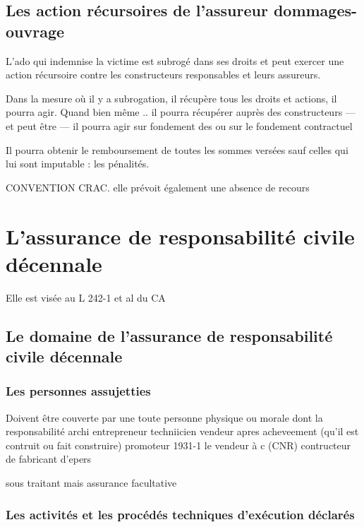 
	\subsection{Les action récursoires de l'assureur dommages-ouvrage}

		L'ado qui indemnise la victime est subrogé dans ses droits et peut exercer une action récursoire contre les constructeurs responsables et leurs assureurs.

		Dans la mesure où il y a subrogation, il récupère tous les droits et actions, il pourra agir. Quand bien même .. il pourra récupérer auprès des constructeurs --- et peut être --- il pourra agir sur fondement des \garSpec ou sur le fondement contractuel 

		Il pourra obtenir le remboursement de toutes les sommes versées sauf celles qui lui sont imputable : les pénalités.

		CONVENTION CRAC. elle prévoit également une absence de recours

\section{L'assurance de responsabilité civile décennale}

	Elle est visée au L 242-1 et al du CA

	\subsection{Le domaine de l'assurance de responsabilité civile décennale}



		\subsubsection{Les personnes assujetties}

			Doivent être couverte par une \rcd  toute personne physique ou morale dont la responsabilité
			archi
			entrepreneur
			techniicien
			vendeur apres acheveement (qu'il est contruit ou fait construire)
			promoteur 1931-1
			le vendeur à c (CNR)
			contructeur de
			fabricant d'epers

			sous traitant mais assurance facultative

		\subsubsection{Les activités et les procédés techniques d'exécution déclarés}

